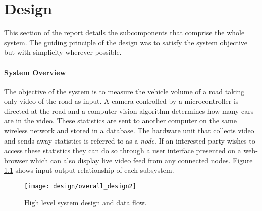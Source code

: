 \chapter{Design}

This section of the report details the subcomponents that comprise the whole system. The guiding principle of the design was to satisfy the system objective but with simplicity wherever possible. 

\subsubsection{System Overview}

The objective of the system is to measure the vehicle volume of a road taking only video of the road as input. A camera controlled by a microcontroller is directed at the road and a computer vision algorithm determines how many cars are in the video. These statistics are sent to another computer on the same wireless network and stored in a database. The hardware unit that collects video and sends away statistics is referred to as a \emph{node}. If an interested party wishes to access these statistics they can do so through a user interface presented on a web-browser which can also display live video feed from any connected nodes. Figure \ref{fig:overall_design} shows input output relationship of each subsystem.

\begin{figure}[H]
    \centering
    \texttt{[image: design/overall\_design2]}
    \caption{High level system design and data flow.}
    \label{fig:overall_design}
\end{figure}








